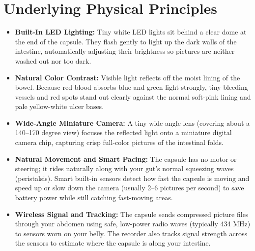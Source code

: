 \section{Underlying Physical Principles}
\begin{itemize}
    \item \textbf{Built-In LED Lighting:} Tiny white LED lights sit behind a clear dome at the end of the capsule. They flash gently to light up the dark walls of the intestine, automatically adjusting their brightness so pictures are neither washed out nor too dark.
    \item \textbf{Natural Color Contrast:} Visible light reflects off the moist lining of the bowel. Because red blood absorbs blue and green light strongly, tiny bleeding vessels and red spots stand out clearly against the normal soft-pink lining and pale yellow-white ulcer bases.
    \item \textbf{Wide-Angle Miniature Camera:} A tiny wide-angle lens (covering about a 140--170 degree view) focuses the reflected light onto a miniature digital camera chip, capturing crisp full-color pictures of the intestinal folds.
    \item \textbf{Natural Movement and Smart Pacing:} The capsule has no motor or steering; it rides naturally along with your gut's normal squeezing waves (peristalsis). Smart built-in sensors detect how fast the capsule is moving and speed up or slow down the camera (usually 2--6 pictures per second) to save battery power while still catching fast-moving areas.
    \item \textbf{Wireless Signal and Tracking:} The capsule sends compressed picture files through your abdomen using safe, low-power radio waves (typically 434 MHz) to sensors worn on your belly. The recorder also tracks signal strength across the sensors to estimate where the capsule is along your intestine.
\end{itemize}

